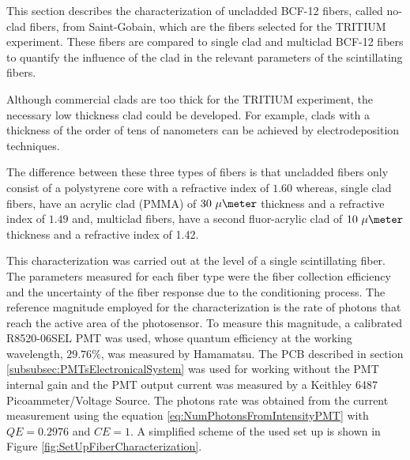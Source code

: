 This section describes the characterization of uncladded BCF-12 fibers, called no-clad fibers, from Saint-Gobain, which are the fibers selected for the TRITIUM experiment. These fibers are compared to single clad and multiclad BCF-12 fibers to quantify the influence of the clad in the relevant parameters of the scintillating fibers.

Although commercial clads are too thick for the TRITIUM experiment, the necessary low thickness clad could be developed. For example, clads with a thickness of the order of tens of nanometers can be achieved by electrodeposition techniques.

The difference between these three types of fibers is that uncladded fibers only consist of a polystyrene core with a refractive index of $1.60$ whereas, single clad fibers, have an acrylic clad (PMMA) of $30~\mu\meter$ thickness and a refractive index of $1.49$ and, multiclad fibers, have a second fluor-acrylic clad of $10~\mu\meter$ thickness  and a refractive index of 1.42.




This characterization was carried out at the level of a single scintillating fiber. The parameters measured for each fiber type were the fiber collection efficiency and the uncertainty of the fiber response due to the conditioning process. The reference magnitude employed for the characterization is the rate of photons that reach the active area of the photosensor. To measure this magnitude, a calibrated R8520-06SEL PMT was used, whose quantum efficiency at the working wavelength, $29.76\%$, was measured by Hamamatsu. The PCB described in section \ref{subsubsec:PMTsElectronicalSystem} was used for working without the PMT internal gain and the PMT output current was measured by a Keithley 6487 Picoammeter/Voltage Source. The photons rate was obtained from the current measurement using the equation \ref{eq:NumPhotonsFromIntensityPMT} with $QE=0.2976$ and $CE=1$. A simplified scheme of the used set up is shown in Figure \ref{fig:SetUpFiberCharacterization}.

